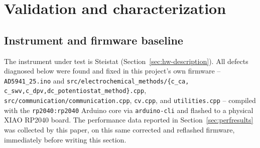\section{Validation and characterization}
\label{sec:validation}

\subsection{Instrument and firmware baseline}
The instrument under test is Steistat (Section~\ref{sec:hw-description}).
All defects diagnosed below were found and fixed in this project's
own firmware -- \texttt{AD5941\_25.ino} and
\texttt{src/electrochemical\_methods/\allowbreak\{c\_ca,\allowbreak
c\_swv,\allowbreak c\_dpv,\allowbreak dc\_potentiostat\_method\}.cpp},
\texttt{src/communication/\allowbreak communication.cpp}, \texttt{cv.cpp}, and
\texttt{utilities.cpp} -- compiled with the \texttt{rp2040:rp2040} Arduino
core via \texttt{arduino-cli} and flashed to a physical XIAO RP2040 board.
The performance data reported in Section~\ref{sec:perfresults} was
collected by this paper, on this same corrected and reflashed firmware,
immediately before writing this section.

